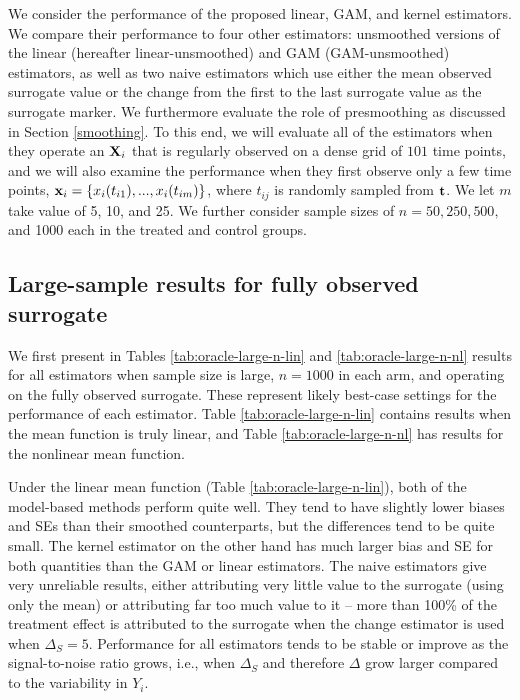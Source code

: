 \documentclass[useAMS,usenatbib,referee]{biom}
\begin{document}
We consider the performance of the proposed linear, GAM, and kernel estimators. We compare their performance to four other estimators: unsmoothed versions of the linear (hereafter linear-unsmoothed) and GAM (GAM-unsmoothed) estimators, as well as two naive estimators which use either the mean observed surrogate value or the change from the first to the last surrogate value as the surrogate marker. We furthermore evaluate the role of presmoothing as discussed in Section \ref{smoothing}. To this end, we will evaluate all of the estimators when they operate an ${\bf X}_i$ that is regularly observed on a dense grid of $101$ time points, and we will also examine the performance when they first observe only a few time points, ${\bf x}_i = \{x_i(t_{i1}), ..., x_i(t_{im})\}$, where $t_{ij}$ is randomly sampled from ${\bf t}$. We let $m$ take value of 5, 10, and 25. We further consider sample sizes of $n = 50, 250, 500,$ and 1000 each in the treated and control groups. 

\subsection{Large-sample results for fully observed surrogate} We first present in Tables \ref{tab:oracle-large-n-lin} and \ref{tab:oracle-large-n-nl} results for all estimators when sample size is large, $n = 1000$ in each arm, and operating on the fully observed surrogate. These represent likely best-case settings for the performance of each estimator. Table \ref{tab:oracle-large-n-lin} contains results when the mean function is truly linear, and Table \ref{tab:oracle-large-n-nl} has results for the nonlinear mean function. 

Under the linear mean function (Table \ref{tab:oracle-large-n-lin}), both of the model-based methods perform quite well. They tend to have slightly lower biases and SEs than their smoothed counterparts, but the differences tend to be quite small. The kernel estimator on the other hand has much larger bias and SE for both quantities than the GAM or linear estimators. The naive estimators give very unreliable results, either attributing very little value to the surrogate (using only the mean) or attributing far too much value to it -- more than 100\% of the treatment effect is attributed to the surrogate when the change estimator is used when $\Delta_S = 5$. Performance for all estimators tends to be stable or improve as the signal-to-noise ratio grows, i.e., when $\Delta_S$ and therefore $\Delta$ grow larger compared to the variability in $Y_i$.
\end{document}
